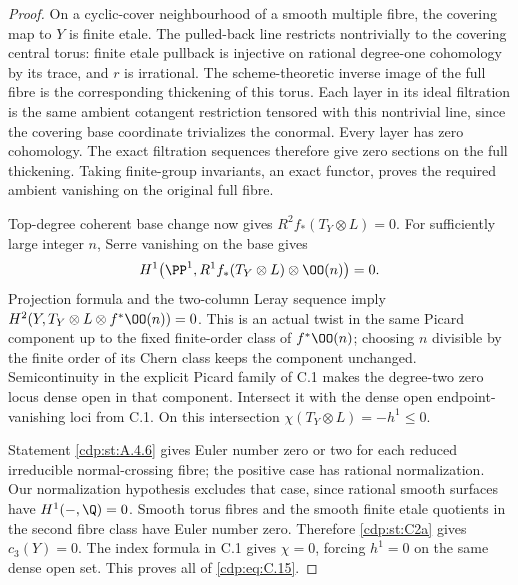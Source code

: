 \begin{proof}
On a cyclic-cover neighbourhood of a smooth multiple fibre, the covering map to $Y$ is finite etale. The pulled-back line restricts nontrivially to the covering central torus: finite etale pullback is injective on rational degree-one cohomology by its trace, and $r$ is irrational. The scheme-theoretic inverse image of the full fibre is the corresponding thickening of this torus. Each layer in its ideal filtration is the same ambient cotangent restriction tensored with this nontrivial line, since the covering base coordinate trivializes the conormal. Every layer has zero cohomology. The exact filtration sequences therefore give zero sections on the full thickening. Taking finite-group invariants, an exact functor, proves the required ambient vanishing on the original full fibre.

Top-degree coherent base change now gives $R^2f_*(T_Y\otimes L)=0$. For sufficiently large integer $n$, Serre vanishing on the base gives
\[
H^1\bigl(\PP^1,R^1f_*(T_Y\otimes L)\otimes\OO(n)\bigr)=0.
\]
Projection formula and the two-column Leray sequence imply
$H^2(Y,T_Y\otimes L\otimes f^*\OO(n))=0$.
This is an actual twist in the same Picard component up to the fixed finite-order class of $f^*\OO(n)$; choosing $n$ divisible by the finite order of its Chern class keeps the component unchanged. Semicontinuity in the explicit Picard family of C.1 makes the degree-two zero locus dense open in that component. Intersect it with the dense open endpoint-vanishing loci from C.1. On this intersection $\chi(T_Y\otimes L)=-h^1\le0$.

Statement \ref{cdp:st:A.4.6} gives Euler number zero or two for each reduced irreducible normal-crossing fibre; the positive case has rational normalization. Our normalization hypothesis excludes that case, since rational smooth surfaces have $H^1(-,\Q)=0$. Smooth torus fibres and the smooth finite etale quotients in the second fibre class have Euler number zero. Therefore \ref{cdp:st:C2a} gives $c_3(Y)=0$. The index formula in C.1 gives $\chi=0$, forcing $h^1=0$ on the same dense open set. This proves all of \eqref{cdp:eq:C.15}.
\end{proof}


